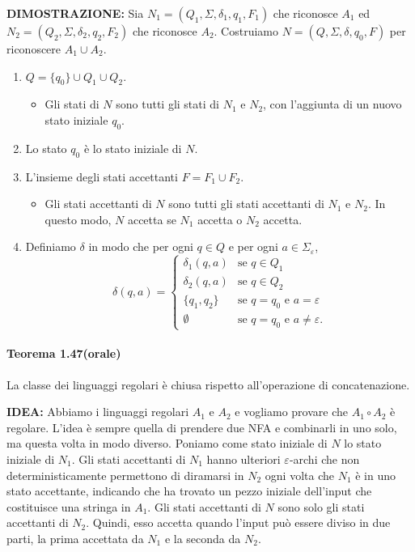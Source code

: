 \documentclass{article}
\begin{document}
\textbf{DIMOSTRAZIONE:}
Sia $N_1 = (Q_1, \Sigma, \delta_1, q_1, F_1)$ che riconosce $A_1$ ed
$N_2 = (Q_2, \Sigma, \delta_2, q_2, F_2)$ che riconosce $A_2$.
Costruiamo $N = (Q, \Sigma, \delta, q_0, F)$ per riconoscere $A_1 \cup A_2$.
\begin{enumerate}
    \item $Q = \{q_0\} \cup Q_1 \cup Q_2.$
        \begin{itemize}
            \item Gli stati di $N$ sono tutti gli stati di $N_1$ e $N_2$, con l'aggiunta di un nuovo stato iniziale $q_0$.
        \end{itemize}
    \item Lo stato $q_0$ è lo stato iniziale di $N$.
    \item L'insieme degli stati accettanti $F = F_1 \cup F_2$.
        \begin{itemize}
            \item Gli stati accettanti di $N$ sono tutti gli stati accettanti di $N_1$ e $N_2$. In questo modo, $N$ accetta se $N_1$ accetta o $N_2$ accetta.
        \end{itemize}
    \item Definiamo $\delta$ in modo che per ogni $q \in Q$ e per ogni $a \in \Sigma_\varepsilon$,
    \[
    \delta(q, a) =
    \begin{cases}
        \delta_1(q, a) & \text{se } q \in Q_1 \\
        \delta_2(q, a) & \text{se } q \in Q_2 \\
        \{q_1, q_2\} & \text{se } q = q_0 \text{ e } a = \varepsilon \\
        \emptyset & \text{se } q = q_0 \text{ e } a \neq \varepsilon.
    \end{cases}
    \]
\end{enumerate}

\paragraph{Teorema 1.47(orale)}
\label{teorema-1.47}
\vspace{1em}
\text{}
\newline
\begin{tcolorbox}[colback=green!10!white, colframe=green!50!black, title=Teorema 1.47 (orale)]
    La  classe dei linguaggi regolari è chiusa rispetto all'operazione di concatenazione.
\end{tcolorbox}

\textbf{IDEA:}
Abbiamo i linguaggi regolari $A_{1}$ e $A_{2}$ e vogliamo provare che $A_{1}\circ A_{2}$ è regolare.
L'idea è sempre quella di prendere due NFA e combinarli in uno solo, ma questa volta in modo diverso. Poniamo come stato iniziale di $N$ lo stato iniziale di $N_{1}$. Gli stati accettanti di $N_{1}$ hanno ulteriori $\varepsilon$-archi che non deterministicamente permettono di diramarsi in $N_{2}$ ogni volta che $N_{1}$ è in uno stato accettante, indicando che ha trovato un pezzo iniziale dell'input che costituisce una stringa in $A_{1}$. Gli stati accettanti di $N$ sono solo gli stati accettanti di $N_{2}$. Quindi, esso accetta quando l'input può essere diviso in due parti, la prima accettata da $N_{1}$ e la seconda da $N_{2}$.
\end{document}
